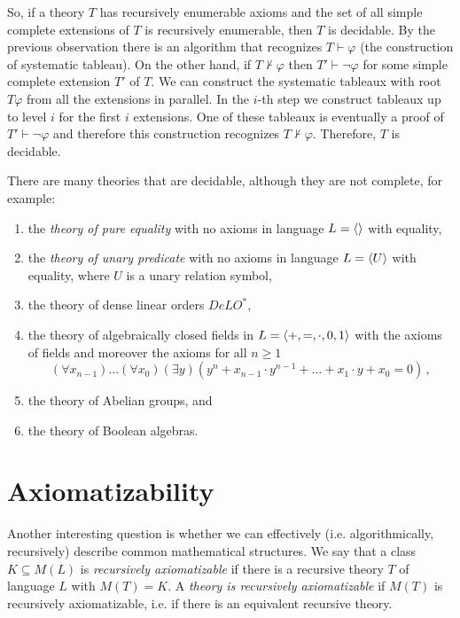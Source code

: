 So, if a theory $T$ has recursively enumerable axioms and the set of all simple complete extensions of $T$ is recursively enumerable, then $T$ is decidable. By the previous observation there is an algorithm that recognizes $T \vdash \varphi$ (the construction of systematic tableau). On the other hand, if $T \nvdash \varphi$ then $T' \vdash \neg \varphi$ for some simple complete extension $T'$ of $T$. We can construct the systematic tableaux with root $T \varphi$ from all the extensions in parallel. In the $i$-th step we construct tableaux up to level $i$ for the first $i$ extensions. One of these tableaux is eventually a proof of $T' \vdash \neg \varphi$ and therefore this construction recognizes $T \nvdash \varphi$. Therefore, $T$ is decidable.

There are many theories that are decidable, although they are not complete, for example:
\begin{enumerate}
  \item the \emph{theory of pure equality} with no axioms in language $L = \langle  \rangle$ with equality,
  \item the \emph{theory of unary predicate} with no axioms in language $L = \langle U \rangle$ with equality, where $U$ is a unary relation symbol,
  \item the theory of dense linear orders $DeLO^*$,
  \item the theory of algebraically closed fields in $L = \langle +, =, \cdot, 0, 1 \rangle$ with the axioms of fields and moreover the axioms for all $n \geq 1$ $$(\forall x_{n-1})\dots(\forall x_0)(\exists y)(y^n + x_{n-1}\cdot y^{n-1} + \dots + x_1\cdot y + x_0 = 0)\,,$$
  \item the theory of Abelian groups, and
  \item the theory of Boolean algebras.
\end{enumerate}

\section{Axiomatizability}

Another interesting question is whether we can effectively (i.e. algorithmically, recursively) describe common mathematical structures. We say that a class $K \subseteq M(L)$ is \emph{recursively axiomatizable} if there is a recursive theory $T$ of language $L$ with $M(T)=K$. A \emph{theory is recursively axiomatizable} if $M(T)$ is recursively axiomatizable, i.e. if there is an equivalent recursive theory.

